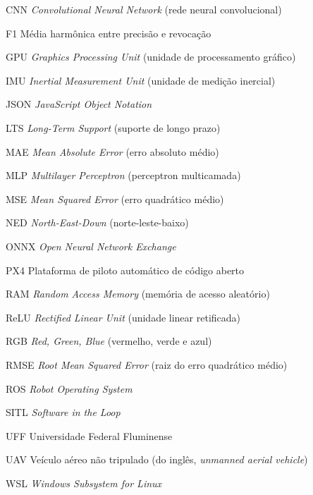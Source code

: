 \begin{siglas}
  \item[CNN] \textit{Convolutional Neural Network} (rede neural convolucional)
  \item[F1] Média harmônica entre precisão e revocação
  \item[GPU] \textit{Graphics Processing Unit} (unidade de processamento gráfico)
  \item[IMU] \textit{Inertial Measurement Unit} (unidade de medição inercial)
  \item[JSON] \textit{JavaScript Object Notation}
  \item[LTS] \textit{Long-Term Support} (suporte de longo prazo)
  \item[MAE] \textit{Mean Absolute Error} (erro absoluto médio)
  \item[MLP] \textit{Multilayer Perceptron} (perceptron multicamada)
  \item[MSE] \textit{Mean Squared Error} (erro quadrático médio)
  \item[NED] \textit{North-East-Down} (norte-leste-baixo)
  \item[ONNX] \textit{Open Neural Network Exchange}
  \item[PX4] Plataforma de piloto automático de código aberto
  \item[RAM] \textit{Random Access Memory} (memória de acesso aleatório)
  \item[ReLU] \textit{Rectified Linear Unit} (unidade linear retificada)
  \item[RGB] \textit{Red, Green, Blue} (vermelho, verde e azul)
  \item[RMSE] \textit{Root Mean Squared Error} (raiz do erro quadrático médio)
  \item[ROS] \textit{Robot Operating System}
  \item[SITL] \textit{Software in the Loop}
  \item[UFF] Universidade Federal Fluminense
  \item[UAV] Veículo aéreo não tripulado (do inglês, \emph{unmanned aerial vehicle})
  \item[WSL] \textit{Windows Subsystem for Linux}
\end{siglas}
